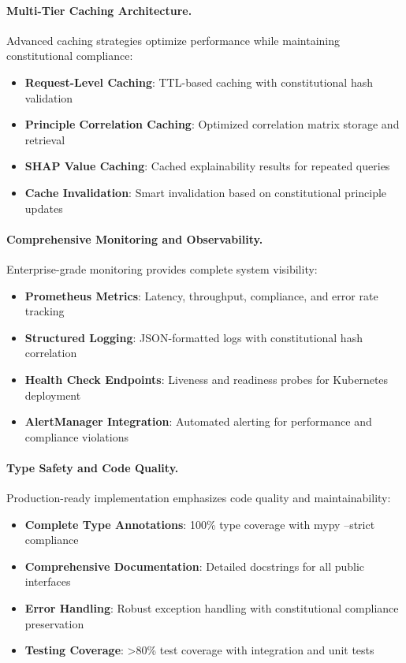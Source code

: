 \documentclass[manuscript,screen,9pt]{acmart}
\begin{document}
\paragraph{Multi-Tier Caching Architecture.}
Advanced caching strategies optimize performance while maintaining constitutional compliance:

\begin{itemize}[itemsep=1pt,parsep=1pt]
    \item \textbf{Request-Level Caching}: TTL-based caching with constitutional hash validation
    \item \textbf{Principle Correlation Caching}: Optimized correlation matrix storage and retrieval
    \item \textbf{SHAP Value Caching}: Cached explainability results for repeated queries
    \item \textbf{Cache Invalidation}: Smart invalidation based on constitutional principle updates
\end{itemize}

\paragraph{Comprehensive Monitoring and Observability.}
Enterprise-grade monitoring provides complete system visibility:

\begin{itemize}[itemsep=1pt,parsep=1pt]
    \item \textbf{Prometheus Metrics}: Latency, throughput, compliance, and error rate tracking
    \item \textbf{Structured Logging}: JSON-formatted logs with constitutional hash correlation
    \item \textbf{Health Check Endpoints}: Liveness and readiness probes for Kubernetes deployment
    \item \textbf{AlertManager Integration}: Automated alerting for performance and compliance violations
\end{itemize}

\paragraph{Type Safety and Code Quality.}
Production-ready implementation emphasizes code quality and maintainability:

\begin{itemize}[itemsep=1pt,parsep=1pt]
    \item \textbf{Complete Type Annotations}: 100\% type coverage with mypy --strict compliance
    \item \textbf{Comprehensive Documentation}: Detailed docstrings for all public interfaces
    \item \textbf{Error Handling}: Robust exception handling with constitutional compliance preservation
    \item \textbf{Testing Coverage}: >80\% test coverage with integration and unit tests
\end{itemize}
\end{document}
